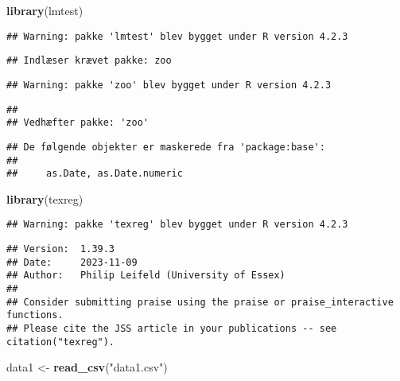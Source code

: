 \documentclass[
]{article}
\newenvironment{Shaded}{\begin{snugshade}}{\end{snugshade}}
\newcommand{\FunctionTok}[1]{\textcolor[rgb]{0.13,0.29,0.53}{\textbf{#1}}}
\newcommand{\NormalTok}[1]{#1}
\newcommand{\OtherTok}[1]{\textcolor[rgb]{0.56,0.35,0.01}{#1}}
\newcommand{\StringTok}[1]{\textcolor[rgb]{0.31,0.60,0.02}{#1}}
\begin{document}
\begin{Shaded}
\begin{Highlighting}[]
\FunctionTok{library}\NormalTok{(lmtest)}
\end{Highlighting}
\end{Shaded}

\begin{verbatim}
## Warning: pakke 'lmtest' blev bygget under R version 4.2.3
\end{verbatim}

\begin{verbatim}
## Indlæser krævet pakke: zoo
\end{verbatim}

\begin{verbatim}
## Warning: pakke 'zoo' blev bygget under R version 4.2.3
\end{verbatim}

\begin{verbatim}
## 
## Vedhæfter pakke: 'zoo'
\end{verbatim}

\begin{verbatim}
## De følgende objekter er maskerede fra 'package:base':
## 
##     as.Date, as.Date.numeric
\end{verbatim}

\begin{Shaded}
\begin{Highlighting}[]
\FunctionTok{library}\NormalTok{(texreg)}
\end{Highlighting}
\end{Shaded}

\begin{verbatim}
## Warning: pakke 'texreg' blev bygget under R version 4.2.3
\end{verbatim}

\begin{verbatim}
## Version:  1.39.3
## Date:     2023-11-09
## Author:   Philip Leifeld (University of Essex)
## 
## Consider submitting praise using the praise or praise_interactive functions.
## Please cite the JSS article in your publications -- see citation("texreg").
\end{verbatim}

\begin{Shaded}
\begin{Highlighting}[]
\NormalTok{data1 }\OtherTok{\textless{}{-}} \FunctionTok{read\_csv}\NormalTok{(}\StringTok{"data1.csv"}\NormalTok{)}
\end{Highlighting}
\end{Shaded}
\end{document}
